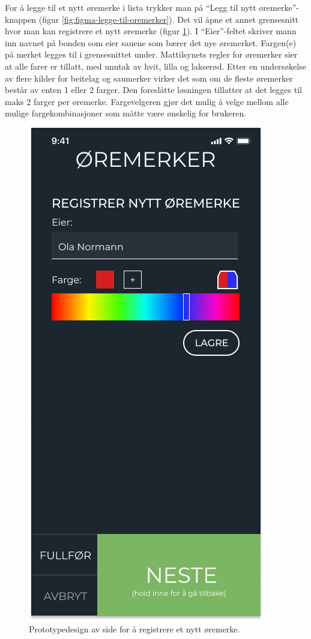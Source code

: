 \noindent
For å legge til et nytt øremerke i lista trykker man på \enquote{Legg til nytt øremerke}-knappen (figur \ref{fig:figma-legge-til-oremerker}). Det vil åpne et annet grensesnitt hvor man kan registrere et nytt øremerke (figur \ref{fig:figma-registrere-nytt-oremerke}). I \enquote{Eier}-feltet skriver mann inn navnet på bonden som eier sauene som bærer det nye øremerket. Fargen(e) på merket legges til i grensesnittet under. Mattilsynets regler for øremerker \cite{Mattilsynet2013remerkingSmafe} sier at alle farer er tillatt, med unntak av hvit, lilla og lakserød. Etter en undersøkelse av flere kilder \cite{remerker, GolSA, NannestadGeit} for beitelag og saumerker virker det som om de fleste øremerker består av enten 1 eller 2 farger. Den foreslåtte løsningen tillatter at det legges til maks 2 farger per øremerke. Fargevelgeren gjør det mulig å velge mellom alle mulige fargekombinasjoner som måtte være ønskelig for brukeren.
\begin{figure}[H]
\centering
\captionsetup{width=.8\linewidth}
\includegraphics[scale=0.4]{Figurer/Figma/Frame 2.2.2 - lag-oremerke.png}
\caption{Prototypedesign av side for å registrere et nytt øremerke.}
\label{fig:figma-registrere-nytt-oremerke}
\end{figure}
